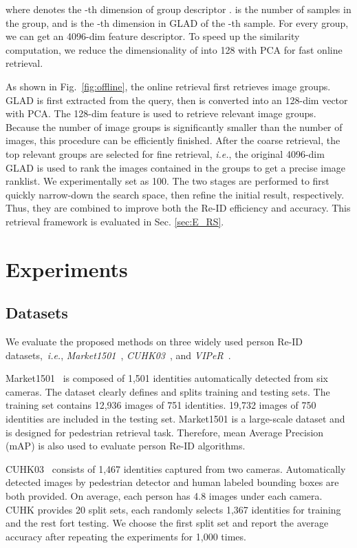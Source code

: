 \documentclass[sigconf]{acmart}
\begin{document}
where  denotes the -th dimension of group descriptor .  is the number of samples in the group, and  is the -th dimension in GLAD of the -th sample. For every group, we can get an 4096-dim feature descriptor. To speed up the similarity computation, we reduce the dimensionality of  into 128 with PCA for fast online retrieval.

As shown in Fig.~\ref{fig:offline}, the online retrieval first retrieves image groups. GLAD is first extracted from the query, then is converted into an 128-dim vector with PCA. The 128-dim feature is used to retrieve relevant image groups. Because the number of image groups is significantly smaller than the number of images, this procedure can be efficiently finished. After the coarse retrieval, the top  relevant groups are selected for fine retrieval, \emph{i.e.}, the original 4096-dim GLAD is used to rank the images contained in the  groups to get a precise image ranklist. We experimentally set  as 100. The two stages are performed to first quickly narrow-down the search space, then refine the initial result, respectively. Thus, they are combined to improve both the Re-ID efficiency and accuracy. This retrieval framework is evaluated in Sec. \ref{sec:E_RS}.


\section{Experiments}
\label{sec:exper}

\subsection{Datasets}\label{sec:dataset}

We evaluate the proposed methods on three widely used person Re-ID datasets,~\emph{i.e.}, \emph{Market1501}~\cite{market1501}, \emph{CUHK03}~\cite{li2014deepreid}, and \emph{VIPeR}~\cite{viper}.

Market1501~\cite{market1501} is composed of 1,501 identities automatically detected from six cameras. The dataset clearly defines and splits training and testing sets. The training set contains 12,936 images of 751 identities. 19,732 images of 750 identities are included in the testing set. Market1501 is a large-scale dataset and is designed for pedestrian retrieval task. Therefore, mean Average Precision (mAP) is also used to evaluate person Re-ID algorithms.

CUHK03~\cite{li2014deepreid} consists of 1,467 identities captured from two cameras. Automatically detected images by pedestrian detector and human labeled bounding boxes are both provided. On average, each person has 4.8 images under each camera. CUHK provides 20 split sets, each randomly selects 1,367 identities for training and the rest fort testing. We choose the first split set and report the average accuracy after repeating the experiments for 1,000 times.
\end{document}
